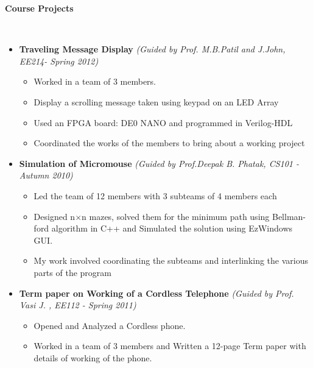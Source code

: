 \documentclass[a4paper,11pt]{article}
\newcommand{\isep}{-2 pt}
\newcommand{\lsep}{-0.5cm}
\newcommand{\resheading}[1]{{\small \colorbox{mygrey}{\begin{minipage}{0.975\textwidth}{\textbf{#1 \vphantom{p\^{E}}}}\end{minipage}}}}
\begin{document}
\resheading{\textbf{\large Course Projects}}\\[\lsep]
\begin{itemize}
\item \textbf{Traveling Message Display} \emph{(Guided by Prof. M.B.Patil and J.John, EE214- Spring 2012)}\\[-0.6cm]
    \begin{itemize}\itemsep \isep
        \item Worked in a team of 3 members.
        \item Display a scrolling message taken using keypad on an LED Array 
        \item Used an FPGA board: DE0 NANO and programmed in Verilog-HDL
        \item Coordinated the works of the members to bring about a working project
    \end{itemize}

\item \textbf{Simulation of Micromouse} \emph{(Guided by Prof.Deepak B. Phatak, CS101 - Autumn 2010)}\\[-0.6cm]
	\begin{itemize}\itemsep \isep 
	    \item Led the team of 12 members with 3 subteams of 4 members each 
	    \item Designed n$\times$n mazes, solved them for the minimum path using Bellman-ford algorithm in C++ and Simulated the solution using EzWindows GUI.
	    \item My work involved coordinating the subteams and interlinking the various parts of the program
	\end{itemize} 
\item \textbf{Term paper on Working of a Cordless Telephone} \emph{(Guided by Prof. Vasi J. , EE112 - Spring 2011)\\[-0.6cm]}
	\begin{itemize} \itemsep \isep
	  \item Opened and Analyzed a Cordless phone.
	  \item Worked in a team of 3 members and Written a 12-page Term paper with details of working of the phone.
	\end{itemize}
\end{itemize}
\end{document}
